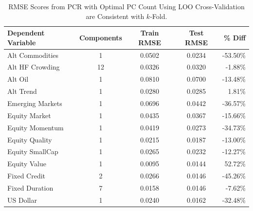 \documentclass{ledger}
\begin{document}
\begin{table}[ht]
\centering
\caption{RMSE Scores from PCR with Optimal PC Count Using LOO Cross-Validation are Consistent with $k$-Fold. \label{table:rmse_scores_LOO}}
	\begin{tabularx}{350pt}{lcccr}
	\toprule
		\textbf{Dependent Variable} & \textbf{Components} & \textbf{Train RMSE} & \textbf{Test RMSE} & \textbf{\% Diff} \\
	\midrule
		Alt Commodities & 1 & 0.0502 & 0.0234 & -53.50\% \\
		Alt HF Crowding & 12 & 0.0326 & 0.0320 & -1.88\% \\
		Alt Oil & 1 & 0.0810 & 0.0700 & -13.48\% \\
		Alt Trend & 1 & 0.0280 & 0.0285 & 1.81\% \\
		Emerging Markets & 1 & 0.0696 & 0.0442 & -36.57\% \\
		Equity Market & 1 & 0.0435 & 0.0367 & -15.66\% \\
		Equity Momentum & 1 & 0.0419 & 0.0273 & -34.73\% \\
		Equity Quality & 1 & 0.0215 & 0.0187 & -13.00\% \\
		Equity SmallCap & 1 & 0.0265 & 0.0232 & -12.27\% \\
		Equity Value & 1 & 0.0095 & 0.0144 & 52.72\% \\
		Fixed Credit & 2 & 0.0266 & 0.0146 & -45.26\% \\
		Fixed Duration & 7 & 0.0158 & 0.0146 & -7.62\% \\
		US Dollar & 1 & 0.0240 & 0.0162 & -32.48\% \\
\bottomrule
\end{tabularx}
\end{table}


%


\end{document}
